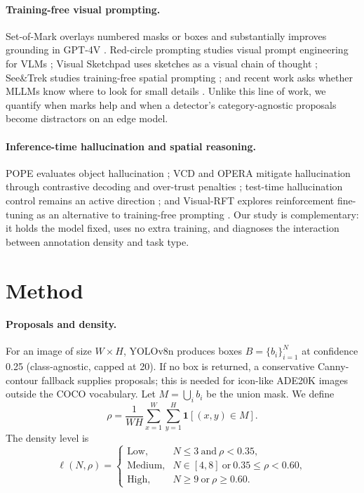 \documentclass[10pt,twocolumn]{article}
\begin{document}
\paragraph{Training-free visual prompting.}
Set-of-Mark overlays numbered masks or boxes and substantially improves grounding in GPT-4V \cite{yang2023setofmark}. Red-circle prompting studies visual prompt engineering for VLMs \cite{shtedritski2023redcircle}; Visual Sketchpad uses sketches as a visual chain of thought \cite{hu2024sketchpad}; See\&Trek studies training-free spatial prompting \cite{seetrek2025}; and recent work asks whether MLLMs know where to look for small details \cite{zhang2025mllmsknow}. Unlike this line of work, we quantify when marks help and when a detector's category-agnostic proposals become distractors on an edge model.

\paragraph{Inference-time hallucination and spatial reasoning.}
POPE evaluates object hallucination \cite{li2023pope}; VCD and OPERA mitigate hallucination through contrastive decoding and over-trust penalties \cite{leng2024vcd,huang2024opera}; test-time hallucination control remains an active direction \cite{tth2026}; and Visual-RFT explores reinforcement fine-tuning as an alternative to training-free prompting \cite{liu2025visualrft}. Our study is complementary: it holds the model fixed, uses no extra training, and diagnoses the interaction between annotation density and task type.

\section{Method}
\label{sec:method}
\paragraph{Proposals and density.}
For an image of size $W\times H$, YOLOv8n \cite{jocher2023yolov8} produces boxes $B=\{b_i\}_{i=1}^{N}$ at confidence 0.25 (class-agnostic, capped at 20). If no box is returned, a conservative Canny-contour fallback supplies proposals; this is needed for icon-like ADE20K images outside the COCO vocabulary. Let $M=\bigcup_i b_i$ be the union mask. We define
\begin{equation}
\rho = \frac{1}{WH}\sum_{x=1}^{W}\sum_{y=1}^{H}\mathbf{1}\left[(x,y)\in M\right].
\end{equation}
The density level is
\begin{equation}
\ell(N,\rho)=
\begin{cases}
\text{Low}, & N\le 3 \ \text{and}\ \rho<0.35,\\
\text{Medium}, & N\in[4,8]\ \text{or}\ 0.35\le\rho<0.60,\\
\text{High}, & N\ge 9\ \text{or}\ \rho\ge0.60.
\end{cases}
\end{equation}
\end{document}
